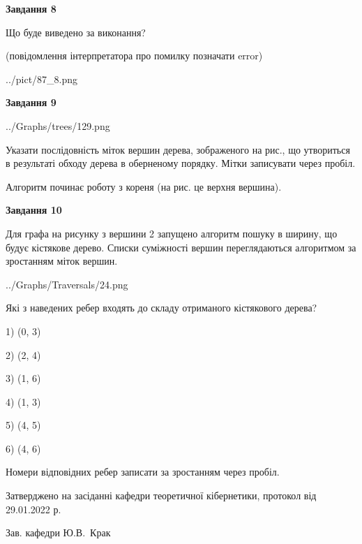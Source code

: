 \documentclass[12pt, ukrainian]{article}
\begin{document}
{\begin {large}
{\begin {center}\textbf{Завдання 8}\end {center}}\par
Що буде виведено за виконання?\par
 (повідомлення інтерпретатора про помилку позначати error)\par
\begin{center}
	{../pict/87_8.png}
\end{center}
\newpage

{\begin {center}\textbf{Завдання 9}\end {center}}\par

\begin{center}
	{../Graphs/trees/129.png}
\end{center}
Указати послідовність міток вершин дерева, зображеного на рис., що утвориться в результаті обходу дерева в оберненому порядку. Мітки записувати через пробіл.\par Алгоритм починає роботу з кореня (на рис. це верхня вершина).\par
\newpage

{\begin {center}\textbf{Завдання 10}\end {center}}\par
Для графа на рисунку з вершини 2 запущено алгоритм пошуку в ширину, що будує кістякове дерево. Списки суміжності вершин переглядаються алгоритмом за зростанням міток вершин.\par
\begin{center}
	{../Graphs/Traversals/24.png}
\end{center}
\par Які з наведених ребер входять до складу отриманого кістякового дерева?\par
1) (0, 3)\par
2) (2, 4)\par
3) (1, 6)\par
4) (1, 3)\par
5) (4, 5)\par
6) (4, 6)\par
{\vskip 15pt} Номери відповідних ребер записати за зростанням через пробіл.\par
\newpage


\end {large}
}
{\smallskip \begin {small} Затверджено на засіданні кафедри теоретичної кібернетики, протокол  від   29.01.2022 р.\par\smallskip\smallskip
{\parbox {6.5 cm}{Зав. кафедри \dotfill Ю.В.~Крак}} \end{small}}
\end{document}
